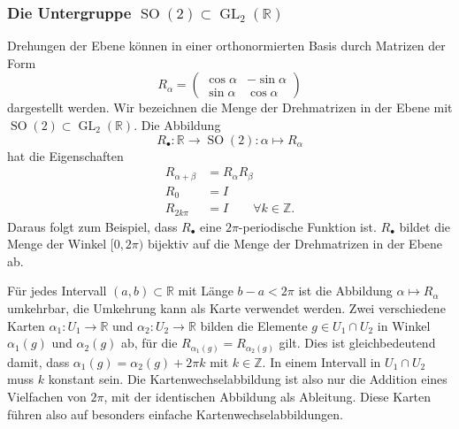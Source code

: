 \subsubsection{Die Untergruppe
$\operatorname{SO}(2)\subset \operatorname{GL}_2(\mathbb{R})$}
Drehungen der Ebene können in einer orthonormierten Basis durch
Matrizen der Form
\[
R_{\alpha}
=
\begin{pmatrix}
\cos\alpha&-\sin\alpha\\
\sin\alpha& \cos\alpha
\end{pmatrix}
\]
dargestellt werden.
Wir bezeichnen die Menge der Drehmatrizen in der Ebene mit
$\operatorname{SO}(2)\subset\operatorname{GL}_2(\mathbb{R})$.
Die Abbildung
\[
R_{\bullet}
\colon
\mathbb{R}\to \operatorname{SO}(2)
:
\alpha \mapsto R_{\alpha}
\]
hat die Eigenschaften
\begin{equation}
\begin{aligned}
R_{\alpha+\beta}&= R_{\alpha}R_{\beta}
\\
R_0&=I
\\
R_{2k\pi}&=I\qquad \forall k\in\mathbb{Z}.
\end{aligned}
\label{buch:lie:so2matrizen}
\end{equation}
Daraus folgt zum Beispiel, dass $R_{\bullet}$ eine $2\pi$-periodische
Funktion ist.
$R_{\bullet}$ bildet die Menge der Winkel $[0,2\pi)$ bijektiv auf
die Menge der Drehmatrizen in der Ebene ab.

Für jedes Intervall $(a,b)\subset\mathbb{R}$ mit Länge
$b-a < 2\pi$ ist die Abbildung $\alpha\mapsto R_{\alpha}$ umkehrbar,
die Umkehrung kann als Karte verwendet werden.
Zwei verschiedene Karten $\alpha_1\colon U_1\to\mathbb{R}$ und
$\alpha_2\colon U_2\to\mathbb{R}$ bilden die Elemente $g\in U_1\cap U_2$
in Winkel $\alpha_1(g)$ und $\alpha_2(g)$ ab, für die 
$R_{\alpha_1(g)}=R_{\alpha_2(g)}$ gilt.
Dies ist gleichbedeutend damit, dass $\alpha_1(g)=\alpha_2(g)+2\pi k$
mit $k\in \mathbb{Z}$.
In einem Intervall in $U_1\cap U_2$ muss $k$ konstant sein.
Die Kartenwechselabbildung ist also nur die Addition eines Vielfachen
von $2\pi$, mit der identischen Abbildung als Ableitung.
Diese Karten führen also auf besonders einfache Kartenwechselabbildungen.

